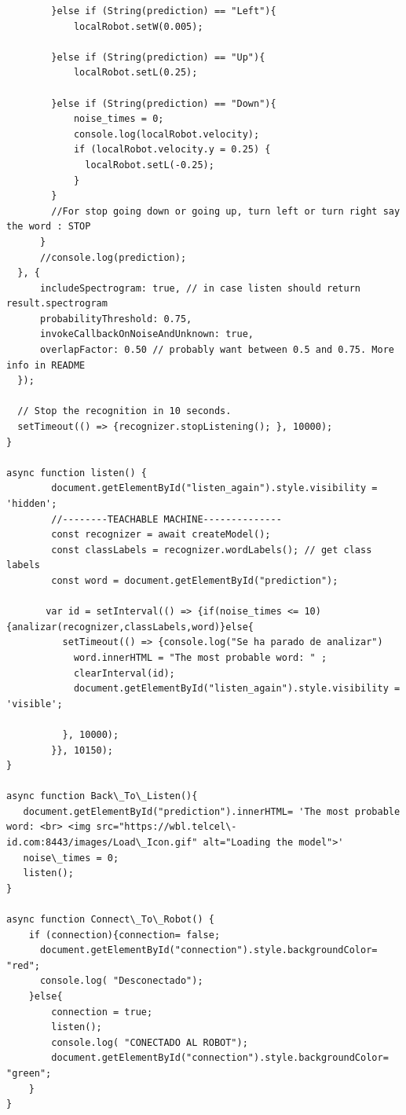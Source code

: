 \begin{lstlisting}
        }else if (String(prediction) == "Left"){
            localRobot.setW(0.005);

        }else if (String(prediction) == "Up"){
            localRobot.setL(0.25);

        }else if (String(prediction) == "Down"){
            noise_times = 0;
            console.log(localRobot.velocity);
            if (localRobot.velocity.y = 0.25) {
              localRobot.setL(-0.25);
            }
        }
        //For stop going down or going up, turn left or turn right say the word : STOP
      }
      //console.log(prediction);
  }, {
      includeSpectrogram: true, // in case listen should return result.spectrogram
      probabilityThreshold: 0.75,
      invokeCallbackOnNoiseAndUnknown: true,
      overlapFactor: 0.50 // probably want between 0.5 and 0.75. More info in README
  });

  // Stop the recognition in 10 seconds.
  setTimeout(() => {recognizer.stopListening(); }, 10000);
}

async function listen() {
        document.getElementById("listen_again").style.visibility = 'hidden';
        //--------TEACHABLE MACHINE--------------
        const recognizer = await createModel();
        const classLabels = recognizer.wordLabels(); // get class labels
        const word = document.getElementById("prediction");
        
       var id = setInterval(() => {if(noise_times <= 10){analizar(recognizer,classLabels,word)}else{
          setTimeout(() => {console.log("Se ha parado de analizar")
            word.innerHTML = "The most probable word: " ;
            clearInterval(id);
            document.getElementById("listen_again").style.visibility = 'visible';

          }, 10000);
        }}, 10150);
}

async function Back\_To\_Listen(){
   document.getElementById("prediction").innerHTML= 'The most probable word: <br> <img src="https://wbl.telcel\-id.com:8443/images/Load\_Icon.gif" alt="Loading the model">'
   noise\_times = 0;
   listen();
}

async function Connect\_To\_Robot() {
    if (connection){connection= false;
      document.getElementById("connection").style.backgroundColor= "red";
      console.log( "Desconectado");
    }else{
        connection = true;
        listen();
        console.log( "CONECTADO AL ROBOT");
        document.getElementById("connection").style.backgroundColor= "green";
    }
}
\end{lstlisting}

